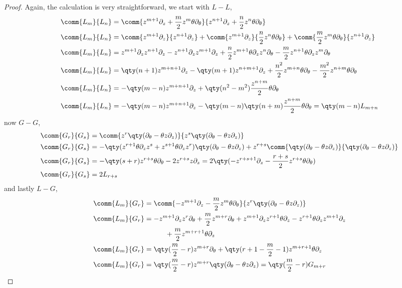 \begin{proof}
    Again, the calculation is very straightforward, we start with $L-L$,
    \begin{align*}
        \comm{L_m}{L_n}&=\comm{z^{m+1}\partial_z+\frac{m}{2}z^m\theta\partial_\theta}{z^{n+1}\partial_z+\frac{n}{2}z^n\theta\partial_\theta}\\
        \comm{L_m}{L_n}&=\comm{z^{m+1}\partial_z}{z^{n+1}\partial_z}+\comm{z^{m+1}\partial_z}{\frac{n}{2}z^n\theta\partial_\theta}+\comm{\frac{m}{2}z^m\theta\partial_\theta}{z^{n+1}\partial_z}\\
        \comm{L_m}{L_n}&=z^{m+1}\partial_zz^{n+1}\partial_z-z^{n+1}\partial_zz^{m+1}\partial_z+\frac{n}{2}z^{m+1}\theta\partial_zz^n\partial_\theta-\frac{m}{2}z^{n+1}\theta\partial_zz^m\partial_\theta\\
        \comm{L_m}{L_n}&=\qty(n+1)z^{m+n+1}\partial_z-\qty(m+1)z^{n+m+1}\partial_z+\frac{n^2}{2}z^{m+n}\theta\partial_\theta-\frac{m^2}{2}z^{n+m}\theta\partial_\theta\\
        \comm{L_m}{L_n}&=-\qty(m-n)z^{m+n+1}\partial_z+\qty(n^2-m^2)\frac{z^{n+m}}{2}\theta\partial_\theta\\
        \comm{L_m}{L_n}&=-\qty(m-n)z^{m+n+1}\partial_z-\qty(m-n)\qty(n+m)\frac{z^{n+m}}{2}\theta\partial_\theta=\qty(m-n)L_{m+n}
    \end{align*}
    now $G-G$,
    \begin{align*}
        \comm{G_r}{G_s}&=\comm{z^{r}\qty(\partial_\theta-\theta z\partial_z)}{z^{s}\qty(\partial_\theta-\theta z\partial_z)}\\
        \comm{G_r}{G_s}&=-\qty(z^{r+1}\theta\partial_z z^{s}+z^{s+1}\theta\partial_z z^{r})\qty(\partial_\theta-\theta z\partial_z)+z^{r+s}\comm{\qty(\partial_\theta-\theta z\partial_z)}{\qty(\partial_\theta-\theta z\partial_z)}\\
        \comm{G_r}{G_s}&=-\qty(s+r)z^{r+s}\theta\partial_\theta-2z^{r+s}z\partial_z=2\qty(-z^{r+s+1}\partial_z-\frac{r+s}{2}z^{r+s}\theta\partial_\theta)\\
        \comm{G_r}{G_s}&=2L_{r+s}
    \end{align*}
    and lastly $L-G$,
    \begin{align*}
        \comm{L_m}{G_r}&=\comm{-z^{m+1}\partial_z-\frac{m}{2}z^m\theta\partial_\theta}{z^{r}\qty(\partial_\theta-\theta z\partial_z)}\\
        \comm{L_m}{G_r}&=-z^{m+1}\partial_z z^{r}\partial_\theta+\frac{m}{2}z^{m+r}\partial_\theta+z^{m+1}\partial_z z^{r+1}\theta\partial_z-z^{r+1}\theta\partial_zz^{m+1}\partial_z\\
        &\quad\quad\quad+\frac{m}{2}z^{m+r+1}\theta\partial_z\\
        \comm{L_m}{G_r}&=\qty(\frac m2-r)z^{m+r}\partial_\theta+\qty(r+1-\frac m2 -1)z^{m+r+1}\theta\partial_z\\
        \comm{L_m}{G_r}&=\qty(\frac m2-r)z^{m+r}\qty(\partial_\theta-\theta z\partial_z)=\qty(\frac m2-r)G_{m+r}
    \end{align*}
\end{proof}
